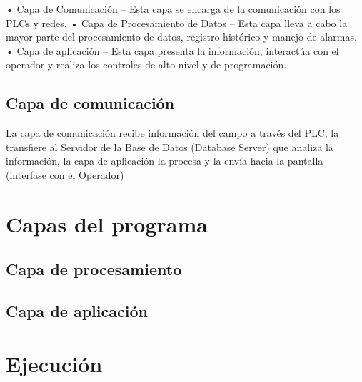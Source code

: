 • Capa de Comunicación – Esta capa se encarga de la comunicación con los PLCs y redes.
• Capa de Procesamiento de Datos – Esta capa lleva a cabo la mayor parte del procesamiento de datos, registro histórico y manejo de alarmas.
• Capa de aplicación – Esta capa presenta la información, interactúa con el operador y realiza los controles de alto nivel y de programación.

\subsection{Capa de comunicación}
\label{subsec:CapaComunicacion}

La capa de comunicación recibe información del campo a través del 
PLC, la transfiere al Servidor de la Base de Datos (Database Server) 
que analiza la información, la capa de aplicación la procesa y la 
envía hacia la pantalla (interfase con el Operador)

\section{Capas del programa}
\label{sec:CapasPrograma}



\subsection{Capa de procesamiento}
\label{subsec:CapaProcesamiento}


\subsection{Capa de aplicación}
\label{subsec:CapaAplicacion}


\section{Ejecución}
\label{sec:Ejecucion}
